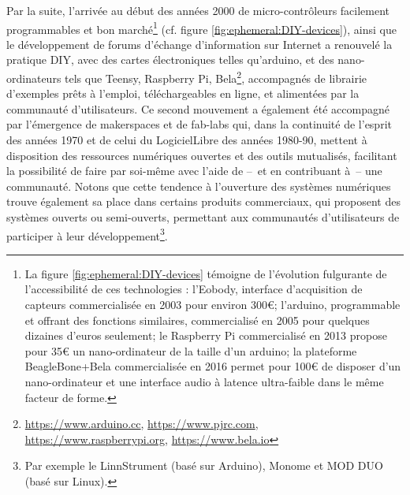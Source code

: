 \indent Par la suite, l'arrivée au début des années 2000 de micro-contrôleurs facilement programmables et bon marché\footnote{La figure \ref{fig:ephemeral:DIY-devices} témoigne de l'évolution fulgurante de l'accessibilité de ces technologies : l'Eobody, interface d'acquisition de capteurs commercialisée en 2003 pour environ 300€; l'arduino, programmable et offrant des fonctions similaires, commercialisé en 2005 pour quelques dizaines d'euros seulement; le Raspberry Pi commercialisé en 2013 propose pour 35€ un nano-ordinateur de la taille d'un arduino; la plateforme BeagleBone+Bela commercialisée en 2016 permet pour 100€ de disposer d'un nano-ordinateur et une interface audio à latence ultra-faible dans le même facteur de forme.} (cf. figure \ref{fig:ephemeral:DIY-devices}), ainsi que le développement de forums d'échange d'information sur Internet a renouvelé la pratique \gls{DIY}, avec des cartes électroniques telles qu'arduino, et des nano-ordinateurs tels que Teensy, Raspberry Pi, Bela\footnote{\url{https://www.arduino.cc}, \url{https://www.pjrc.com}, \url{https://www.raspberrypi.org}, \url{https://www.bela.io}}, accompagnés de librairie d'exemples prêts à l'emploi, téléchargeables en ligne, et alimentées par la communauté d'utilisateurs. Ce second mouvement a également été accompagné par l'émergence de \glspl{makerspace} et de \glspl{fab-lab} qui, dans la continuité de l'esprit des années 1970 et de celui du \gls{LogicielLibre} des années 1980-90, mettent à disposition des ressources numériques ouvertes et des outils mutualisés, facilitant la possibilité de faire par soi-même avec l'aide de --~et en contribuant à~-- une communauté. Notons que cette tendence à l'ouverture des systèmes numériques trouve également sa place dans certains produits commerciaux, qui proposent des systèmes ouverts ou semi-ouverts, permettant aux communautés d'utilisateurs de participer à leur développement\footnote{Par exemple le LinnStrument (basé sur Arduino), Monome et MOD DUO (basé sur Linux).}.\\

